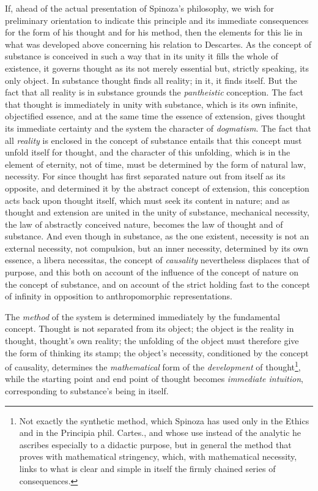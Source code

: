 \documentclass[12pt,a4paper,openany]{book}
\newcommand{\opage}[1]{\marginnote{\footnotesize\textit{[#1]}}}
\begin{document}
If, ahead of the actual presentation of Spinoza's philosophy, we wish
for preliminary orientation to indicate this principle and its immediate
consequences for the form of his thought and for his method, then the
elements for this lie in what was developed above concerning his
relation to Descartes. As the concept of substance is conceived in such
a way that in its unity it fills the whole of existence, it governs
thought as its not merely essential but, strictly speaking, its only
\opage{25}\setcounter{footnote}{0}object. In substance thought finds all
reality; in it, it finds itself. But the fact that all reality is in
substance grounds the \emph{pantheistic} conception. The fact that
thought is immediately in unity with substance, which is its own
infinite, objectified essence, and at the same time the essence of
extension, gives thought its immediate certainty and the system the
character of \emph{dogmatism}. The fact that all \emph{reality} is
enclosed in the concept of substance entails that this concept must
unfold itself for thought, and the character of this unfolding, which is
in the element of eternity, not of time, must be determined by the form
of natural law, necessity. For since thought has first separated nature
out from itself as its opposite, and determined it by the abstract
concept of extension, this conception acts back upon thought itself,
which must seek its content in nature; and as thought and extension are
united in the unity of substance, mechanical necessity, the law of
abstractly conceived nature, becomes the law of thought and of substance.
And even though in substance, as the one existent, necessity is not an
external necessity, not compulsion, but an inner necessity, determined
by its own essence, a libera necessitas, the concept of \emph{causality}
nevertheless displaces that of purpose, and this both on account of the
influence of the concept of nature on the concept of substance, and on
account of the strict holding fast to the concept of infinity in
opposition to anthropomorphic representations.

The \emph{method} of the system is determined immediately by the
fundamental concept. Thought is not separated from its object; the object
is the reality in thought, thought's own reality; the unfolding of the
object must therefore give the form of thinking its stamp; the object's
necessity, conditioned by the concept of causality, determines the
\emph{mathematical} form of the \emph{development} of
thought\footnote{Not exactly the synthetic method, which Spinoza has
used only in the Ethics and in the Principia phil. Cartes., and whose use
instead of the analytic he ascribes especially to a didactic purpose,
but in general the method that proves with mathematical stringency,
which, with mathematical necessity, links to what is clear and simple in
itself the firmly chained series of consequences.},
\opage{26}while the starting point and end point of thought becomes
\emph{immediate intuition}, corresponding to substance's being in itself.
\end{document}
